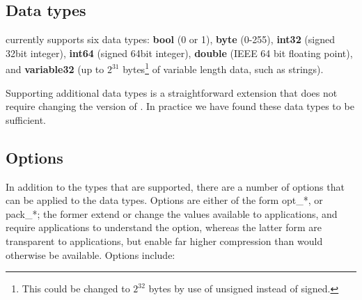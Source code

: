 \subsection{Data types}

%
\DataSeries{} currently supports six data types:
\textbf{bool} (0 or 1),
\textbf{byte} (0-255),
\textbf{int32} (signed 32bit integer),
\textbf{int64} (signed 64bit integer),
\textbf{ double} (IEEE 64 bit floating point), and
\textbf{variable32} (up to $2^{31}$ bytes\footnote{This could be changed to $2^{32}$ bytes by use of unsigned instead of signed.} of variable length data, such as strings).

Supporting additional data types is a straightforward extension that
does not require changing the version of \DataSeries{}.  In practice we
have found these data types to be sufficient.

\subsection{Options}\label{sec:options}

In addition to the types that are supported, there are a number of
options that can be applied to the data types.  Options are either of
the form opt\_*, or pack\_*; the former extend or change the values available
to applications, and require applications to
understand the option, whereas the latter form are transparent
to applications, but enable far higher compression than would otherwise
be available. Options include:

